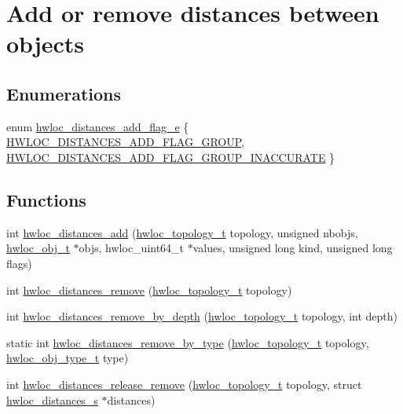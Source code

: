 \hypertarget{a00210}{}\section{Add or remove distances between objects}
\label{a00210}
\subsection*{Enumerations}
\begin{DoxyCompactItemize}
\item 
enum \hyperlink{a00210_ga22428b6bab271411e3834e6b4ca22e37}{hwloc\+\_\+distances\+\_\+add\+\_\+flag\+\_\+e} \{ \hyperlink{a00210_gga22428b6bab271411e3834e6b4ca22e37a7f6baba797d70538d03c9d13052c62ab}{H\+W\+L\+O\+C\+\_\+\+D\+I\+S\+T\+A\+N\+C\+E\+S\+\_\+\+A\+D\+D\+\_\+\+F\+L\+A\+G\+\_\+\+G\+R\+O\+UP}, 
\hyperlink{a00210_gga22428b6bab271411e3834e6b4ca22e37a5233ccf631c3bc53dd5c3e7a5d5c9b77}{H\+W\+L\+O\+C\+\_\+\+D\+I\+S\+T\+A\+N\+C\+E\+S\+\_\+\+A\+D\+D\+\_\+\+F\+L\+A\+G\+\_\+\+G\+R\+O\+U\+P\+\_\+\+I\+N\+A\+C\+C\+U\+R\+A\+TE}
 \}
\end{DoxyCompactItemize}
\subsection*{Functions}
\begin{DoxyCompactItemize}
\item 
int \hyperlink{a00210_gac5a71d96cd86efe31d6f8d282aae3d97}{hwloc\+\_\+distances\+\_\+add} (\hyperlink{a00186_ga9d1e76ee15a7dee158b786c30b6a6e38}{hwloc\+\_\+topology\+\_\+t} topology, unsigned nbobjs, \hyperlink{a00185_ga79b8ab56877ef99ac59b833203391c7d}{hwloc\+\_\+obj\+\_\+t} $\ast$objs, hwloc\+\_\+uint64\+\_\+t $\ast$values, unsigned long kind, unsigned long flags)
\item 
int \hyperlink{a00210_gac188d9b64d9560255ce5f6d0a20f9c0a}{hwloc\+\_\+distances\+\_\+remove} (\hyperlink{a00186_ga9d1e76ee15a7dee158b786c30b6a6e38}{hwloc\+\_\+topology\+\_\+t} topology)
\item 
int \hyperlink{a00210_gaa642a4c1a21c84f38ae23fca8a27845d}{hwloc\+\_\+distances\+\_\+remove\+\_\+by\+\_\+depth} (\hyperlink{a00186_ga9d1e76ee15a7dee158b786c30b6a6e38}{hwloc\+\_\+topology\+\_\+t} topology, int depth)
\item 
static int \hyperlink{a00210_ga93db53773c96f5b83815e8441e2ebb93}{hwloc\+\_\+distances\+\_\+remove\+\_\+by\+\_\+type} (\hyperlink{a00186_ga9d1e76ee15a7dee158b786c30b6a6e38}{hwloc\+\_\+topology\+\_\+t} topology, \hyperlink{a00184_gacd37bb612667dc437d66bfb175a8dc55}{hwloc\+\_\+obj\+\_\+type\+\_\+t} type)
\item 
int \hyperlink{a00210_ga80bbf6f0db9af48c61780dd5152664c2}{hwloc\+\_\+distances\+\_\+release\+\_\+remove} (\hyperlink{a00186_ga9d1e76ee15a7dee158b786c30b6a6e38}{hwloc\+\_\+topology\+\_\+t} topology, struct \hyperlink{a00310}{hwloc\+\_\+distances\+\_\+s} $\ast$distances)
\end{DoxyCompactItemize}



